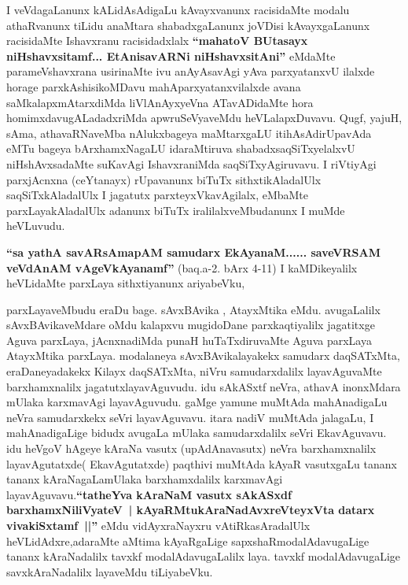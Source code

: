 \begin{artha}
I veVdagaLanunx kALidAsAdigaLu kAvayxvanunx racisidaMte modalu
athaRvanunx tiLidu anaMtara shabadxgaLanunx joVDisi kAvayxgaLanunx
racisidaMte Ishavxranu racisidadxlalx \textbf{``mahatoV BUtasayx niHshavxsitamf... EtAnisavARNi niHshavxsitAni''} eMdaMte
 parameVshavxrana usirinaMte ivu anAyAsavAgi yAva parxyatanxvU ilalxde
horage parxkAshisikoMDavu mahAparxyatanxvilalxde avana
saMkalapxmAtarxdiMda liVlAnAyxyeVna ATavADidaMte hora
homimxdavugALadadxriMda apwruSeVyaveMdu heVLalapxDuvavu. Qugf, yajuH,
sAma, athavaRNaveMba nAlukxbageya maMtarxgaLU itihAsAdirUpavAda eMTu
bageya bArxhamxNagaLU idaraMtiruva shabadxsaqSiTxyelalxvU
niHshAvxsadaMte suKavAgi IshavxraniMda saqSiTxyAgiruvavu. I riVtiyAgi
parxjAcnxna (ceYtanayx) rUpavanunx biTuTx sithxtikAladalUlx
saqSiTxkAladalUlx I jagatutx parxteyxVkavAgilalx, eMbaMte
parxLayakAladalUlx adanunx biTuTx iralilalxveMbudanunx I muMde
heVLuvudu. 
\end{artha}

\begin{artha}
\textbf{``sa yathA savARsAmapAM samudarx EkAyanaM...... saveVRSAM veVdAnAM vAgeVkAyanamf''} (baq.a-2. bArx 4-11) I kaMDikeyalilx heVLidaMte parxLaya
 sithxtiyanunx ariyabeVku,
\end{artha}

\centerline{ }

\begin{artha}
parxLayaveMbudu eraDu bage. sAvxBAvika , AtayxMtika eMdu. avugaLalilx
 sAvxBAvikaveMdare oMdu kalapxvu mugidoDane parxkaqtiyalilx jagatitxge
Aguva parxLaya, jAcnxnadiMda punaH huTaTxdiruvaMte Aguva parxLaya
AtayxMtika parxLaya. modalaneya sAvxBAvikalayakekx samudarx
daqSATxMta, eraDaneyadakekx Kilayx daqSATxMta, niVru  samudarxdalilx
layavAguvaMte barxhamxnalilx jagatutxlayavAguvudu. idu sAkASxtf neVra, athavA
inonxMdara mUlaka karxmavAgi layavAguvudu. gaMge yamune muMtAda
mahAnadigaLu neVra samudarxkekx seVri layavAguvavu. itara nadiV
muMtAda jalagaLu, I mahAnadigaLige bidudx avugaLa mUlaka
samudarxdalilx seVri EkavAguvavu. idu heVgoV hAgeye kAraNa vasutx
(upAdAnavasutx) neVra barxhamxnalilx layavAgutatxde( EkavAgutatxde)
paqthivi muMtAda kAyaR vasutxgaLu tananx tananx kAraNagaLamUlaka
barxhamxdalilx karxmavAgi layavAguvavu.\textbf{``tatheYva kAraNaM vasutx sAkASxdf barxhamxNiliVyateV~| kAyaRMtukAraNadAvxreVteyxVta datarx vivakiSxtamf~||''} eMdu vidAyxraNayxru
vAtiRkasAradalUlx heVLidAdxre,adaraMte aMtima kAyaRgaLige
sapxshaRmodalAdavugaLige tananx kAraNadalilx tavxkf
modalAdavugaLalilx laya. tavxkf modalAdavugaLige savxkAraNadalilx
layaveMdu tiLiyabeVku.
\end{artha}

